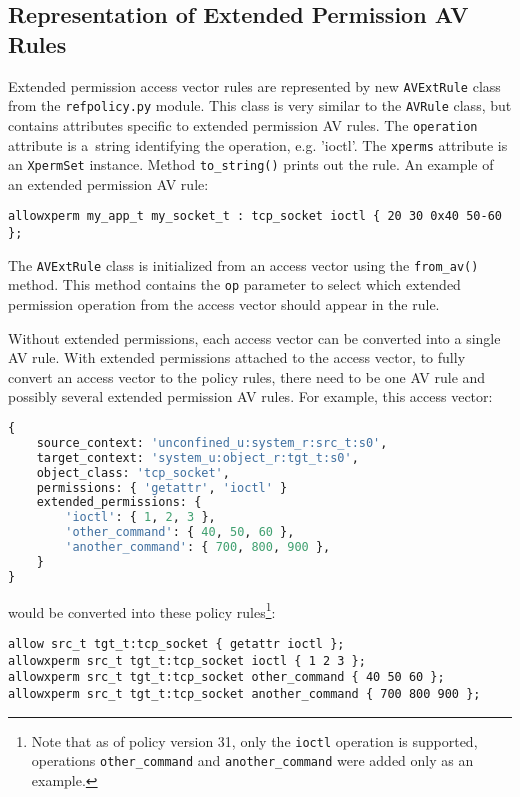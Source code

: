 \subsection{Representation of Extended Permission AV Rules}
Extended permission access vector rules are represented by new
\texttt{AVExtRule} class from the \texttt{refpolicy.py} module. This class is
very similar to the \texttt{AVRule} class, but contains attributes specific to
extended permission AV rules. The \texttt{operation} attribute is a~string
identifying the operation, e.g. 'ioctl'. The \texttt{xperms} attribute is an
\texttt{XpermSet} instance. Method \texttt{to\_string()} prints out the rule.
An example of an extended permission AV rule:
\begin{lstlisting}
allowxperm my_app_t my_socket_t : tcp_socket ioctl { 20 30 0x40 50-60 };
\end{lstlisting}

The \texttt{AVExtRule} class is initialized from an access vector using the
\texttt{from\_av()} method. This method contains the \texttt{op} parameter to
select which extended permission operation from the access vector should appear
in the rule.

Without extended permissions, each access vector can be converted into a single
AV rule. With extended permissions attached to the access vector, to fully
convert an access vector to the policy rules, there need to be one AV rule and
possibly several extended permission AV rules. For example, this access vector:

\begin{lstlisting}[language=Python]
{
    source_context: 'unconfined_u:system_r:src_t:s0',
    target_context: 'system_u:object_r:tgt_t:s0',
    object_class: 'tcp_socket',
    permissions: { 'getattr', 'ioctl' }
    extended_permissions: {
        'ioctl': { 1, 2, 3 },
        'other_command': { 40, 50, 60 },
        'another_command': { 700, 800, 900 },
    }
}
\end{lstlisting}
would be converted into these policy rules\footnote{Note that as of policy
version 31, only the \texttt{ioctl} operation is supported, operations
\texttt{other\_command} and \texttt{another\_command} were added only as an
example.}:
\begin{lstlisting}
allow src_t tgt_t:tcp_socket { getattr ioctl };
allowxperm src_t tgt_t:tcp_socket ioctl { 1 2 3 };
allowxperm src_t tgt_t:tcp_socket other_command { 40 50 60 };
allowxperm src_t tgt_t:tcp_socket another_command { 700 800 900 };
\end{lstlisting}

